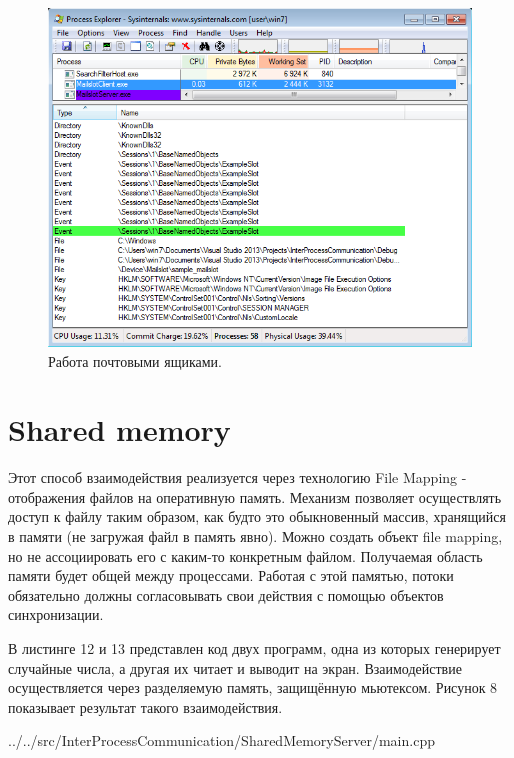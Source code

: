 \documentclass[a4paper, 12pt]{report}		%
\begin{document}
\begin{figure}[h!]
\centering
\includegraphics[scale=0.75]{res/07_Process_Explorer}
\caption{Работа почтовыми ящиками.}
\end{figure}


\chapter*{Shared memory}

Этот способ взаимодействия реализуется через технологию File Mapping - отображения файлов на оперативную память. Механизм позволяет осуществлять доступ к файлу таким образом, как будто это обыкновенный массив, хранящийся в памяти (не загружая файл в память явно). Можно создать объект file mapping, но не ассоциировать его с каким-то конкретным файлом\cite{Dushutina}. Получаемая область памяти будет общей между процессами. Работая с этой памятью, потоки обязательно должны согласовывать свои действия с помощью объектов синхронизации.

В листинге 12 и 13 представлен код двух программ, одна из которых генерирует случайные числа, а другая их читает и выводит на экран. Взаимодействие осуществляется через разделяемую память, защищённую мьютексом. Рисунок 8 показывает результат такого взаимодействия.


{../../src/InterProcessCommunication/SharedMemoryServer/main.cpp}
\end{document}
